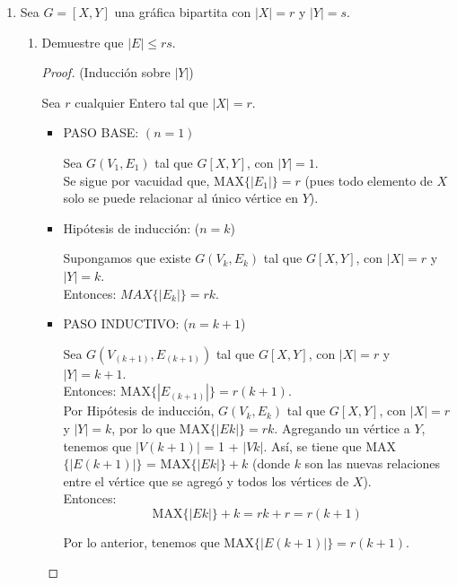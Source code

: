 \documentclass{article}
\begin{document}
\begin{enumerate}
  \item Sea $G = [X, Y]$ una gr\'afica bipartita con $|X| = r$ y $|Y| = s$.

    \begin{enumerate}
      \item Demuestre que $|E| \le rs$.
        \begin{proof}
          (Inducción sobre $|Y|$)

          Sea $r$ cualquier Entero tal que $|X|=r$.
          \begin{itemize}
            \item PASO BASE: $(n = 1)$

              Sea $G(V_1, E_1)$ tal que $G[X,Y]$, con $|Y|=1$. \\
              Se sigue por vacuidad que, MAX$\{|E_1|\}=r$ (pues todo elemento de $X$ solo se puede relacionar al \'unico v\'ertice en $Y$). \\

            \item Hip\'otesis de inducci\'on: ($n = k$)

              Supongamos que existe $G(V_k, E_k)$ tal que $G[X,Y]$, con $|X|=r$ y $|Y|= k$. \\ Entonces: $MAX\{|E_k|\} = rk$. \\

            \item PASO INDUCTIVO: ($n=k+1$)

              Sea $G(V_{(k+1)}, E_{(k+1)})$ tal que $G[X,Y]$, con $|X|=r$ y $|Y|=k+1$. \\
              Entonces: MAX$\{|E_{(k+1)}|\} = r(k+1)$. \\

              Por Hip\'otesis de inducci\'on, $G(V_k, E_k)$ tal que $G[X,Y]$, con $|X|=r$ y $|Y|=k$,
              por lo que MAX$\{|Ek|\}=rk$. Agregando un v\'ertice a $Y$, tenemos que $|V(k+1)|$ = 1 + $|Vk|$. As\'i, se tiene que MAX$\{|E(k+1)|\}$ = MAX$\{|Ek|\} + k$ (donde $k$ son las nuevas relaciones entre el v\'ertice que se agreg\'o y todos los v\'ertices de $X$). \\
              Entonces:
              $$\text{MAX}\{|Ek|\} + k = rk + r = r(k+1)$$

              Por lo anterior, tenemos que MAX$\{|E(k+1)|\} = r(k+1)$.
          \end{itemize}


\end{proof}
\end{enumerate}
\end{enumerate}
\end{document}
